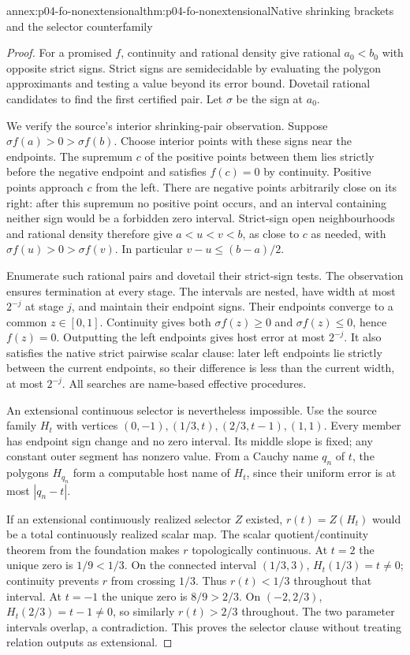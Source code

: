\begin{annexitem}{annex:p04-fo-nonextensional}{thm:p04-fo-nonextensional}{Native shrinking brackets and the selector counterfamily}
\begin{proof}
For a promised \(f\), continuity and rational density give
rational \(a_0<b_0\) with opposite strict signs.
Strict signs are semidecidable by evaluating the polygon
approximants and testing a value beyond its error bound.
Dovetail rational candidates to find the first certified pair.
Let \(\sigma\) be the sign at \(a_0\).

We verify the source's interior shrinking-pair observation.
Suppose \(\sigma f(a)>0>\sigma f(b)\).
Choose interior points with these signs near the endpoints.
The supremum \(c\) of the positive points between them
lies strictly before the negative endpoint and satisfies
\(f(c)=0\) by continuity. Positive points approach \(c\)
from the left. There are negative points arbitrarily close
on its right: after this supremum no positive point occurs,
and an interval containing neither sign would be a forbidden
zero interval. Strict-sign open neighbourhoods and rational
density therefore give \(a<u<v<b\), as close to \(c\)
as needed, with \(\sigma f(u)>0>\sigma f(v)\).
In particular \(v-u\leq(b-a)/2\).

Enumerate such rational pairs and dovetail their strict-sign
tests. The observation ensures termination at every stage.
The intervals are nested, have width at most \(2^{-j}\)
at stage \(j\), and maintain their endpoint signs.
Their endpoints converge to a common \(z\in[0,1]\).
Continuity gives both \(\sigma f(z)\geq0\) and
\(\sigma f(z)\leq0\), hence \(f(z)=0\).
Outputting the left endpoints gives host error at most
\(2^{-j}\). It also satisfies the native strict pairwise
scalar clause: later left endpoints lie strictly between
the current endpoints, so their difference is less than
the current width, at most \(2^{-j}\).
All searches are name-based effective procedures.

An extensional continuous selector is nevertheless impossible.
Use the source family \(H_t\) with vertices
\((0,-1),(1/3,t),(2/3,t-1),(1,1)\).
Every member has endpoint sign change and no zero interval.
Its middle slope is fixed; any constant outer segment has
nonzero value. From a Cauchy name \(q_n\) of \(t\), the
polygons \(H_{q_n}\) form a computable host name of \(H_t\),
since their uniform error is at most \(|q_n-t|\).

If an extensional continuously realized selector \(Z\)
existed, \(r(t)=Z(H_t)\) would be a total continuously
realized scalar map. The scalar quotient/continuity theorem
from the foundation makes \(r\) topologically continuous.
At \(t=2\) the unique zero is \(1/9<1/3\).
On the connected interval \((1/3,3)\), \(H_t(1/3)=t\ne0\);
continuity prevents \(r\) from crossing \(1/3\).
Thus \(r(t)<1/3\) throughout that interval.
At \(t=-1\) the unique zero is \(8/9>2/3\).
On \((-2,2/3)\), \(H_t(2/3)=t-1\ne0\), so similarly
\(r(t)>2/3\) throughout. The two parameter intervals
overlap, a contradiction. This proves the selector clause
without treating relation outputs as extensional.
\end{proof}
\end{annexitem}

